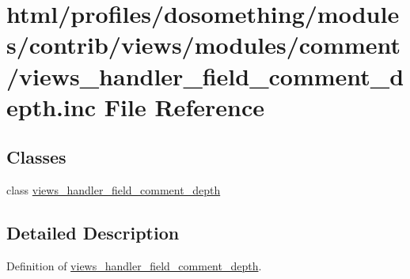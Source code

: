 \hypertarget{views__handler__field__comment__depth_8inc}{
\section{html/profiles/dosomething/modules/contrib/views/modules/comment/views\_\-handler\_\-field\_\-comment\_\-depth.inc File Reference}
\label{views__handler__field__comment__depth_8inc}
}
\subsection*{Classes}
\begin{DoxyCompactItemize}
\item 
class \hyperlink{classviews__handler__field__comment__depth}{views\_\-handler\_\-field\_\-comment\_\-depth}
\end{DoxyCompactItemize}


\subsection{Detailed Description}
Definition of \hyperlink{classviews__handler__field__comment__depth}{views\_\-handler\_\-field\_\-comment\_\-depth}. 